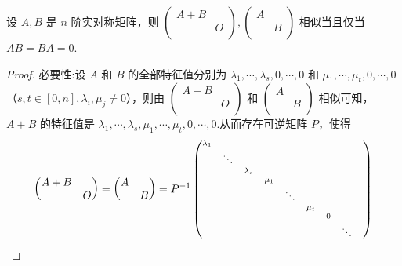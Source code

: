 \documentclass[../../main.tex]{subfiles}%
\begin{document}
\begin{corollary}
设 $A,B$ 是 $n$ 阶实对称矩阵，则
$
\left( \begin{matrix}
A+B&		\\
&		O\\
\end{matrix} \right) , \left( \begin{matrix}
A&		\\
&		B	\\
\end{matrix} \right)
$
相似当且仅当 $AB=BA=0$.
\end{corollary}
\begin{proof}

{\heiti 必要性:}设 $A$ 和 $B$ 的全部特征值分别为 $\lambda _1,\cdots ,\lambda _s,0,\cdots ,0$ 和 $\mu _1,\cdots ,\mu _t,0,\cdots ,0$（$s,t\in [0,n],\lambda _i,\mu _j\ne 0$），则由 $\begin{pmatrix}
A+B&		\\
&		O\\
\end{pmatrix}$ 和 $\begin{pmatrix}
A&		\\
&		B		\\
\end{pmatrix}$ 相似可知，$A+B$ 的特征值是 $\lambda _1,\cdots ,\lambda _s,\mu _1,\cdots ,\mu _t,0,\cdots ,0$.从而存在可逆矩阵 $P$，使得
\begin{align*}
\begin{pmatrix}
A+B&		\\
&		O\\
\end{pmatrix} =\begin{pmatrix}
A&		\\
&		B		\\
\end{pmatrix} =P^{-1}\begin{scriptsize}
\begin{pmatrix}
\lambda _1&		&		&		&		&		&		&		&		\\
&		\ddots&		&		&		&		&		&		&		\\
&		&		\lambda _s&		&		&		&		&		&		\\
&		&		&		\mu _1&		&		&		&		&		\\
&		&		&		&		\ddots&		&		&		&		\\
&		&		&		&		&		\mu _t&		&		&		\\
&		&		&		&		&		&		0&		&		\\
&		&		&		&		&		&		&		\ddots&		\\

\end{pmatrix}
\end{scriptsize}
\end{align*}
\end{proof}
\end{document}
